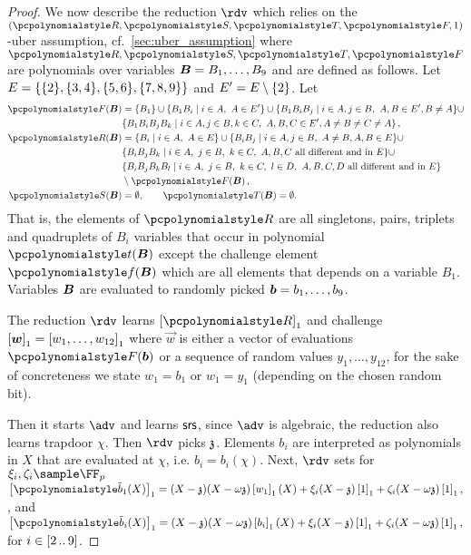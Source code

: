 \begin{proof}
 We now describe the reduction $\rdv$ which
relies on the $(\pR, \pS, \pT, \pF, 1)$-uber assumption, cf.~\cref{sec:uber_assumption}
where $\pR, \pS, \pT, \pF$ are polynomials over variables
$\vB = B_1, \ldots, B_9$ and are defined as follows. Let
$E = \{\{2\}, \{3, 4\}, \{5, 6\}, \{7, 8,
    9\}\}$ and $E' = E \setminus \{2\}$. Let
\begin{align}
\label{eq:uber}
\pF(\vB) & = \smallset{B_1} \cup \smallset{B_1B_i \mid i \in A,\ A \in E'} \cup
             \smallset{B_1B_iB_j \mid i \in A, j \in B,\ A, B \in E', B
             \neq A} \cup \notag\\
           & \smallset{B_1B_iB_jB_k \mid i \in A, j \in
             B, k \in C,\ A, B, C \in E', A \neq B \neq C \neq A}\notag\,,\\
  \pR(\vB) & = \smallset{B_i \mid i \in A,\ A \in E} \cup \smallset{B_i B_j \mid i \in
             A, j \in B,\ A \neq B, A, B \in E} \cup \\ 
           & \smallset{B_i B_j B_k \mid i \in A,\ j \in
             B,\ k \in C,\
             A, B, C \text{ all different and in } E} \cup \notag \\
           & \smallset{B_i B_j B_k B_l \mid i \in A,\ j \in B,\ k \in C,\ l \in D,\
             A, B, C, D \text{ all different and in } E} \notag \\
           & \setminus \pF(\vB)\,,\notag \\
  \pS(\vB) & = \emptyset, \qquad \pT(\vB) = \emptyset.
\end{align}
That is, the elements of $\pR$ are all singletons, pairs, triplets and
quadruplets of $B_i$ variables that occur in polynomial $\pt(\vB)$ except the
challenge element $\pf(\vB)$ which are all elements that depends on a variable
$B_1$. Variables $\vB$ are evaluated to randomly picked
$\vb = b_1, \ldots, b_9$.

The reduction $\rdv$ learns $\gone{\pR}$ and challenge
$\gone{\vec{w}} = \gone{w_1, \ldots, w_{12}}$ where $\vec{w}$ is either a vector
of evaluations $\pF(\vb)$ or a sequence of random values $y_1, \ldots, y_{12}$,
for the sake of concreteness we state $w_1 = b_1$ or $w_1 = y_1$ (depending on
the chosen random bit).

Then it starts $\adv$ and learns $\mathsf{srs}$, since $\adv$ is algebraic, the reduction also learns trapdoor $\chi$. Then $\rdv$ picks $\mathfrak{z}$. Elements $b_i$ are interpreted as polynomials in $X$ that are
evaluated at $\chi$, i.e. $b_i = b_i(\chi)$. Next, $\rdv$ sets for
$\xi_i, \zeta_i \sample \FF_p$
\(
  \gone{\p{\tb}_1(X)} =
(X - \chz)(X - \ochz) \gone{w_1}(X) + \xi_i (X - \chz) \gone{1} +
\zeta_i (X - \ochz) \gone{1}, %
\),
and
\(
  \gone{\p{\tb}_i(X)} =
(X - \chz)(X - \ochz) \gone{b_i}(X) + \xi_i (X - \chz) \gone{1} +
\zeta_i (X - \ochz) \gone{1}, %
\) 
for $i \in [2 \, .. \, 9]$.


\end{proof}
